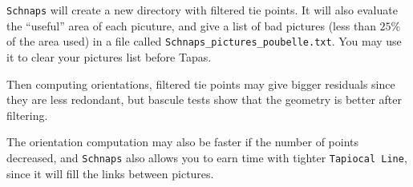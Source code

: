 {\tt Schnaps} will create a new directory with filtered tie points.
It will also evaluate the ``useful'' area of each picuture, and give a list of bad pictures (less than $25\%$ of the area used) in a file called {\tt Schnaps\_pictures\_poubelle.txt}. You may use it to clear your pictures list before Tapas.

Then computing orientations, filtered tie points may give bigger residuals since they are less redondant, but bascule tests show that the geometry is better
after filtering.

The orientation computation may also be faster if the number of points decreased, and {\tt Schnaps} also allows you to earn time with tighter {\tt Tapiocal Line},
since it will fill the links between pictures.



